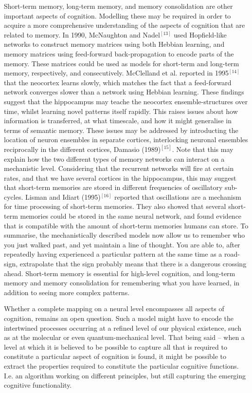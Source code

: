 Short-term memory, long-term memory, and memory consolidation are other important aspects of cognition. Modelling these may be required in order to acquire a more comprehensive understanding of the aspects of cognition that are related to memory. In 1990, McNaughton and Nadel$^{[13]}$ used Hopfield-like networks to construct memory matrices using both Hebbian learning, and memory matrices using feed-forward back-propagation to encode parts of the memory. These matrices could be used as models for short-term and long-term memory, respectively, and consecutively. McClelland et al. reported in 1995$^{[14]}$ that the neocortex learns slowly, which matches the fact that a feed-forward network converges slower than a network using Hebbian learning. These findings suggest that the hippocampus may teache the neocortex ensemble-structures over time, whilst learning novel patterns itself rapidly. This raises issues about how information is transferred, at what timescale, and how it might generalise in terms of semantic memory. These issues may be addressed by introducting the location of neuron ensembles in separate cortices, interlocking neuronal ensembles reciprocally in the different cortices, Damasio (1989)$^{[15]}$. Note that this may explain how the two different types of memory networks can interact on a mechanistic level. Considering that the recurrent networks will fire at certain rates, and that we have several cortices in the hippocampus, this may suggest that short-term memories are stored in different frequencies of oscillatory sub-cycles. Lisman and Idiart (1995)$^{[16]}$ reported that oscillations are a mechanism for time processing of short-term memories. They also showed that several short-term memories could be stored in the same neural network, and found evidence that is compatible with the amount of short-term memories humans can store. To summarise, the mechanistically described models now allow us to remember who you just walked past, and yet maintain a line of thought. You are able to, after repeatedly having experienced a particular pattern at the same time as a road-sign, extrapolate that the sign probably means that there is a dangerous crossing ahead. Short-term memory is essential for high-level cognition, and long-term memory and memory consolidation for remembering what you have learned, in addition to seeing more complex patterns.

Whether a complete mapping on a neural level encompasses all aspects of cognition, remains an open question. Such a model might have to encode the intertwined processes occurring at a refined level of our physical existence, such as at the molecular or even quantum-mechanical level. That being said – when a level at which it is believed to be possible to capture all that is required to constitute a particular aspect of cognition is found, it might be possible to extract the properties required to constitute the particular cognitive functions. I.e. an algorithm working on different principles, but still capturing the emerging cognitive functionality. 

